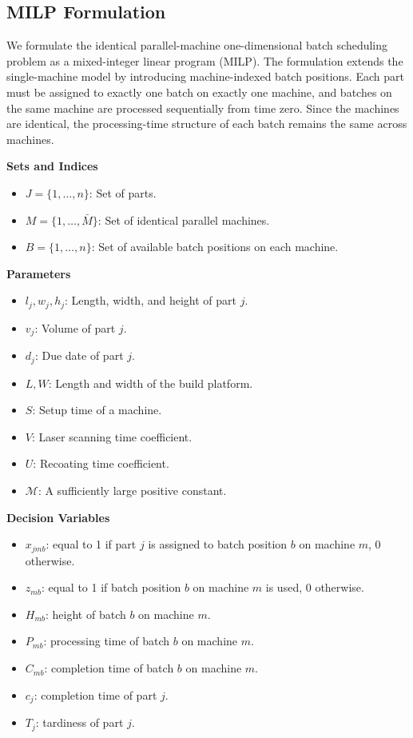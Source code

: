 \documentclass[letterpaper, 10 pt, conference]{ieeeconf}  %
\begin{document}
\subsection{MILP Formulation}
We formulate the identical parallel-machine one-dimensional batch scheduling problem as a mixed-integer linear program (MILP). The formulation extends the single-machine model by introducing machine-indexed batch positions. Each part must be assigned to exactly one batch on exactly one machine, and batches on the same machine are processed sequentially from time zero. Since the machines are identical, the processing-time structure of each batch remains the same across machines.

\noindent \textbf{Sets and Indices}
\begin{itemize}
	\item $J = \{1, \dots, n\}$: Set of parts.
	\item $M = \{1, \dots, \bar M\}$: Set of identical parallel machines.
	\item $B = \{1, \dots, n\}$: Set of available batch positions on each machine.
\end{itemize}

\noindent \textbf{Parameters}
\begin{itemize}
	\item $l_j, w_j, h_j$: Length, width, and height of part $j$.
	\item $v_j$: Volume of part $j$.
	\item $d_j$: Due date of part $j$.
	\item $L, W$: Length and width of the build platform.
	\item $S$: Setup time of a machine.
	\item $V$: Laser scanning time coefficient.
	\item $U$: Recoating time coefficient.
	\item $\mathcal{M}$: A sufficiently large positive constant.
\end{itemize}

\noindent \textbf{Decision Variables}
\begin{itemize}
	\item $x_{jmb}$: equal to 1 if part $j$ is assigned to batch position $b$ on machine $m$, 0 otherwise.
	\item $z_{mb}$: equal to 1 if batch position $b$ on machine $m$ is used, 0 otherwise.
	\item $H_{mb}$: height of batch $b$ on machine $m$.
	\item $P_{mb}$: processing time of batch $b$ on machine $m$.
	\item $C_{mb}$: completion time of batch $b$ on machine $m$.
	\item $c_j$: completion time of part $j$.
	\item $T_j$: tardiness of part $j$.
\end{itemize}
\end{document}
